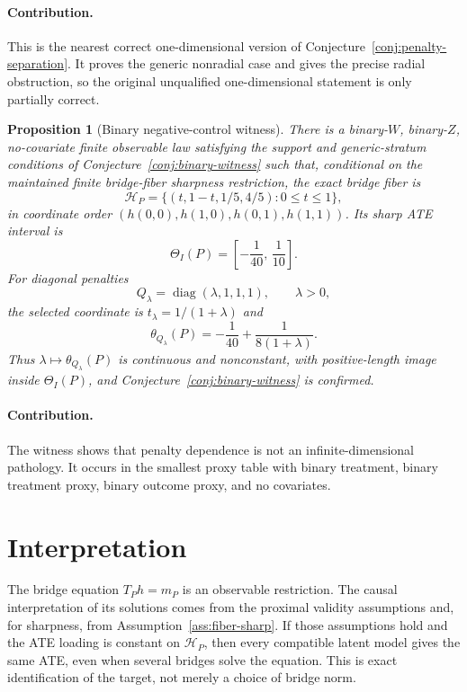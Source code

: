 \documentclass[11pt]{article}
\newcommand{\calH}{\mathcal{H}}
\theoremstyle{definition}
\theoremstyle{plain}
\newtheorem{proposition}{Proposition}
\theoremstyle{remark}
\begin{document}
\paragraph{Contribution.}
This is the nearest correct one-dimensional version of
Conjecture~\ref{conj:penalty-separation}.  It proves the generic nonradial
case and gives the precise radial obstruction, so the original unqualified
one-dimensional statement is only partially correct.

\begin{proposition}[Binary negative-control witness]\label{prop:binary-witness}
There is a binary-\(W\), binary-\(Z\), no-covariate finite observable law
satisfying the support and generic-stratum conditions of
Conjecture~\ref{conj:binary-witness} such that, conditional on the maintained
finite bridge-fiber sharpness restriction, the exact bridge fiber is
\[
  \calH_P=\{(t,1-t,1/5,4/5):0\le t\le1\},
\]
in coordinate order \((h(0,0),h(1,0),h(0,1),h(1,1))\).  Its sharp ATE
interval is
\[
  \Theta_I(P)=\left[-\frac1{40},\,\frac1{10}\right].
\]
For diagonal penalties
\[
  Q_\lambda=\operatorname{diag}(\lambda,1,1,1),\qquad \lambda>0,
\]
the selected coordinate is \(t_\lambda=1/(1+\lambda)\) and
\[
  \theta_{Q_\lambda}(P)
  =
  -\frac1{40}+\frac{1}{8(1+\lambda)}.
\]
Thus \(\lambda\mapsto\theta_{Q_\lambda}(P)\) is continuous and nonconstant,
with positive-length image inside \(\Theta_I(P)\), and Conjecture~\ref{conj:binary-witness}
is confirmed.
\end{proposition}
\paragraph{Contribution.}
The witness shows that penalty dependence is not an infinite-dimensional
pathology.  It occurs in the smallest proxy table with binary treatment,
binary treatment proxy, binary outcome proxy, and no covariates.

\section{Interpretation}
The bridge equation \(T_Ph=m_P\) is an observable restriction.  The causal
interpretation of its solutions comes from the proximal validity assumptions
and, for sharpness, from Assumption~\ref{ass:fiber-sharp}.  If those
assumptions hold and the ATE loading is constant on \(\calH_P\), then every
compatible latent model gives the same ATE, even when several bridges solve
the equation.  This is exact identification of the target, not merely a
choice of bridge norm.
\end{document}
